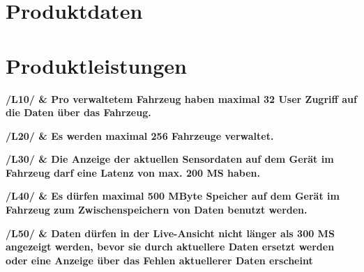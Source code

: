 \documentclass[pflichtenheft.tex]{subfiles}
\begin{document}
\chapter{Produktdaten}

\chapter{Produktleistungen}


\bf{/L10/} & Pro verwaltetem Fahrzeug haben maximal 32 User Zugriff auf die Daten über das Fahrzeug.


\bf{/L20/} & Es werden maximal 256 Fahrzeuge verwaltet.


\bf{/L30/} & Die Anzeige der aktuellen Sensordaten auf dem Gerät im Fahrzeug darf eine Latenz von max. 200 MS haben.


\bf{/L40/} & Es dürfen maximal 500 MByte Speicher auf dem Gerät im Fahrzeug zum Zwischenspeichern von Daten benutzt werden.


\bf{/L50/} & Daten dürfen in der Live-Ansicht nicht länger als 300 MS angezeigt werden, bevor sie durch aktuellere Daten ersetzt werden oder eine Anzeige über das Fehlen aktuellerer Daten erscheint
\end{document}

